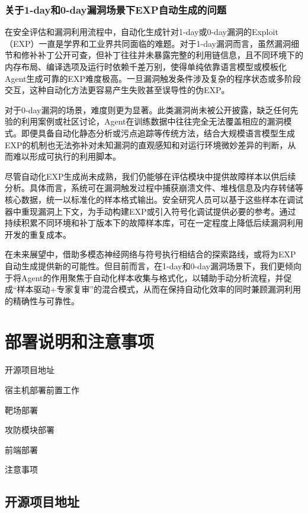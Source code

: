 \documentclass[lang=cn,10pt]{elegantbook}
\begin{document}
\subsection{关于1-day和0-day漏洞场景下EXP自动生成的问题}
在安全评估和漏洞利用流程中，自动化生成针对1-day或0-day漏洞的Exploit（EXP）一直是学界和工业界共同面临的难题。对于1-day漏洞而言，虽然漏洞细节和修补补丁公开可查，但补丁往往并未暴露完整的利用链信息，且不同环境下的内存布局、编译选项及运行时依赖千差万别，使得单纯依靠语言模型或模板化Agent生成可靠的EXP难度极高。一旦漏洞触发条件涉及复杂的程序状态或多阶段交互，这种自动化方法更容易产生失败甚至误导性的伪EXP。

对于0-day漏洞的场景，难度则更为显著。此类漏洞尚未被公开披露，缺乏任何先验的利用案例或社区讨论，Agent在训练数据中往往完全无法覆盖相应的漏洞模式。即便具备自动化静态分析或污点追踪等传统方法，结合大规模语言模型生成EXP的机制也无法弥补对未知漏洞的直观感知和对运行环境微妙差异的判断，从而难以形成可执行的利用脚本。

尽管自动化EXP生成尚未成熟，我们仍能够在评估模块中提供故障样本以供后续分析。具体而言，系统可在漏洞触发过程中捕获崩溃文件、堆栈信息及内存转储等核心数据，统一以标准化的样本格式输出。安全研究人员可以基于这些样本在调试器中重现漏洞上下文，为手动构建EXP或引入符号化调试提供必要的参考。通过持续积累不同环境和补丁版本下的故障样本库，可在一定程度上降低后续漏洞利用开发的重复成本。

在未来展望中，借助多模态神经网络与符号执行相结合的探索路线，或将为EXP自动生成提供新的可能性。但目前而言，在1-day和0-day漏洞场景下，我们更倾向于将Agent的作用聚焦于自动化样本收集与格式化，以辅助手动分析流程，并促成“样本驱动+专家复审”的混合模式，从而在保持自动化效率的同时兼顾漏洞利用的精确性与可靠性。



\hypertarget{chap:deploy}{}
\chapter{部署说明和注意事项}

\begin{introduction}
    \item 开源项目地址
    \item 宿主机部署前置工作
    \item 靶场部署
    \item 攻防模块部署
    \item 前端部署
    \item 注意事项
\end{introduction}

\section{开源项目地址} 
\end{document}
